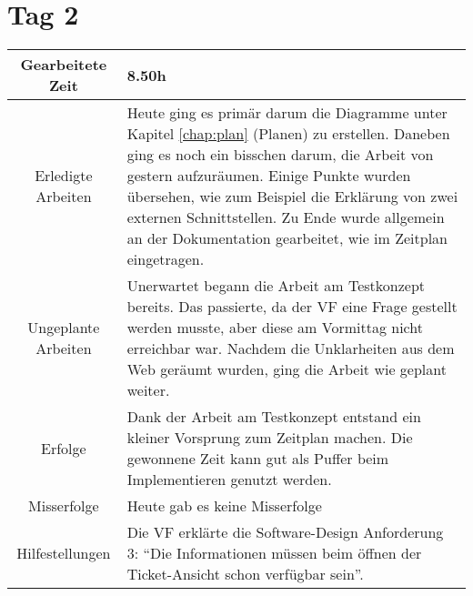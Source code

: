 \section{Tag 2}
\begin{tabularx}{\textwidth}[H]{|c|X|}
  \hline
  Gearbeitete Zeit & 8.50h \\ \hline
  Erledigte Arbeiten & Heute ging es primär darum die Diagramme unter Kapitel \ref{chap:plan}
  (Planen) zu erstellen. Daneben ging es noch ein bisschen darum, die Arbeit von gestern
  aufzuräumen. Einige Punkte wurden übersehen, wie zum Beispiel die Erklärung von zwei
  externen Schnittstellen. Zu Ende wurde allgemein an der Dokumentation gearbeitet, wie
  im Zeitplan eingetragen. \\ \hline
  Ungeplante Arbeiten & Unerwartet begann die Arbeit am Testkonzept bereits. Das passierte,
  da der VF eine Frage gestellt werden musste, aber diese am Vormittag nicht erreichbar war. Nachdem
  die Unklarheiten aus dem Web geräumt wurden, ging die Arbeit wie geplant weiter.
  \\ \hline
  Erfolge & Dank der Arbeit am Testkonzept entstand ein kleiner Vorsprung zum
  Zeitplan machen. Die gewonnene Zeit kann gut als Puffer beim Implementieren genutzt werden.
  \\ \hline
  Misserfolge & Heute gab es keine Misserfolge \\ \hline
  Hilfestellungen & Die VF erklärte die Software-Design Anforderung 3: \enquote{Die 
  Informationen müssen beim öffnen der Ticket-Ansicht schon verfügbar sein}.  \\ \hline
\end{tabularx}

\newpage

